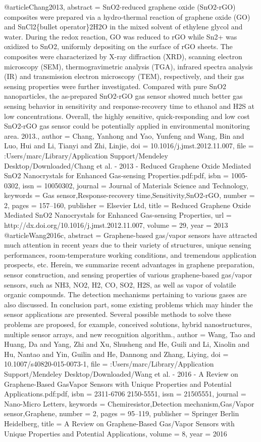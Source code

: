 @article{Chang2013,
abstract = {SnO2-reduced graphene oxide (SnO2-rGO) composites were prepared via a hydro-thermal reaction of graphene oxide (GO) and SnCl2{\{}bullet operator{\}}2H2O in the mixed solvent of ethylene glycol and water. During the redox reaction, GO was reduced to rGO while Sn2+ was oxidized to SnO2, uniformly depositing on the surface of rGO sheets. The composites were characterized by X-ray diffraction (XRD), scanning electron microscopy (SEM), thermogravimetric analysis (TGA), infrared spectra analysis (IR) and transmission electron microscopy (TEM), respectively, and their gas sensing properties were further investigated. Compared with pure SnO2 nanoparticles, the as-prepared SnO2-rGO gas sensor showed much better gas sensing behavior in sensitivity and response-recovery time to ethanol and H2S at low concentrations. Overall, the highly sensitive, quick-responding and low cost SnO2-rGO gas sensor could be potentially applied in environmental monitoring area. {\textcopyright} 2013.},
author = {Chang, Yanhong and Yao, Yunfeng and Wang, Bin and Luo, Hui and Li, Tianyi and Zhi, Linjie},
doi = {10.1016/j.jmst.2012.11.007},
file = {:Users/marc/Library/Application Support/Mendeley Desktop/Downloaded/Chang et al. - 2013 - Reduced Graphene Oxide Mediated SnO2 Nanocrystals for Enhanced Gas-sensing Properties.pdf:pdf},
isbn = {1005-0302},
issn = {10050302},
journal = {Journal of Materials Science and Technology},
keywords = {Gas sensor,Response-recovery time,Sensitivity,SnO2-rGO},
number = {2},
pages = {157--160},
publisher = {Elsevier Ltd},
title = {{Reduced Graphene Oxide Mediated SnO2 Nanocrystals for Enhanced Gas-sensing Properties}},
url = {http://dx.doi.org/10.1016/j.jmst.2012.11.007},
volume = {29},
year = {2013}
}
@article{Wang2016c,
abstract = {Graphene-based gas/vapor sensors have attracted much attention in recent years due to their variety of structures, unique sensing performances, room-temperature working conditions, and tremendous application prospects, etc. Herein, we summarize recent advantages in graphene preparation, sensor construction, and sensing properties of various graphene-based gas/vapor sensors, such as NH3, NO2, H2, CO, SO2, H2S, as well as vapor of volatile organic compounds. The detection mechanisms pertaining to various gases are also discussed. In conclusion part, some existing problems which may hinder the sensor applications are presented. Several possible methods to solve these problems are proposed, for example, conceived solutions, hybrid nanostructures, multiple sensor arrays, and new recognition algorithm.},
author = {Wang, Tao and Huang, Da and Yang, Zhi and Xu, Shusheng and He, Guili and Li, Xiaolin and Hu, Nantao and Yin, Guilin and He, Dannong and Zhang, Liying},
doi = {10.1007/s40820-015-0073-1},
file = {:Users/marc/Library/Application Support/Mendeley Desktop/Downloaded/Wang et al. - 2016 - A Review on Graphene-Based GasVapor Sensors with Unique Properties and Potential Applications.pdf:pdf},
isbn = {2311-6706
2150-5551},
issn = {21505551},
journal = {Nano-Micro Letters},
keywords = {Chemiresistor,Detection mechanism,Gas/Vapor sensor,Graphene},
number = {2},
pages = {95--119},
publisher = {Springer Berlin Heidelberg},
title = {{A Review on Graphene-Based Gas/Vapor Sensors with Unique Properties and Potential Applications}},
volume = {8},
year = {2016}
}
